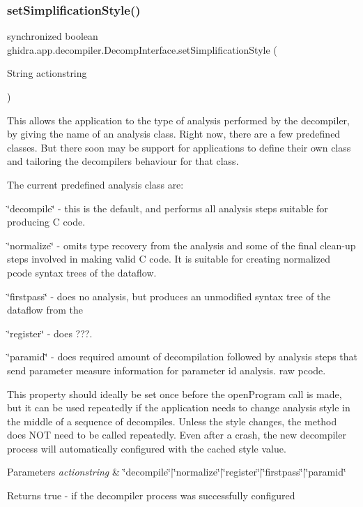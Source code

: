 \subsubsection{\texorpdfstring{setSimplificationStyle()}{setSimplificationStyle()}}
{\footnotesize\ttfamily synchronized boolean ghidra.\+app.\+decompiler.\+Decomp\+Interface.\+set\+Simplification\+Style (\begin{DoxyParamCaption}\item[{String}]{actionstring }\end{DoxyParamCaption})\hspace{0.3cm}{\ttfamily [inline]}}

This allows the application to the type of analysis performed by the decompiler, by giving the name of an analysis class. Right now, there are a few predefined classes. But there soon may be support for applications to define their own class and tailoring the decompiler\textquotesingle{}s behaviour for that class. 

The current predefined analysis class are\+: 
\begin{DoxyItemize}
\item \char`\"{}decompile\char`\"{} -\/ this is the default, and performs all analysis steps suitable for producing C code. 
\item \char`\"{}normalize\char`\"{} -\/ omits type recovery from the analysis and some of the final clean-\/up steps involved in making valid C code. It is suitable for creating normalized pcode syntax trees of the dataflow. 
\item \char`\"{}firstpass\char`\"{} -\/ does no analysis, but produces an unmodified syntax tree of the dataflow from the 
\item \char`\"{}register\char`\"{} -\/ does ???. 
\item \char`\"{}paramid\char`\"{} -\/ does required amount of decompilation followed by analysis steps that send parameter measure information for parameter id analysis. raw pcode. 
\end{DoxyItemize}

This property should ideally be set once before the open\+Program call is made, but it can be used repeatedly if the application needs to change analysis style in the middle of a sequence of decompiles. Unless the style changes, the method does N\+OT need to be called repeatedly. Even after a crash, the new decompiler process will automatically configured with the cached style value.


\begin{DoxyParams}{Parameters}
{\em actionstring} & \char`\"{}decompile\char`\"{}$\vert$\char`\"{}normalize\char`\"{}$\vert$\char`\"{}register\char`\"{}$\vert$\char`\"{}firstpass\char`\"{}$\vert$\char`\"{}paramid\char`\"{} \\
\hline
\end{DoxyParams}
\begin{DoxyReturn}{Returns}
true -\/ if the decompiler process was successfully configured 
\end{DoxyReturn}


